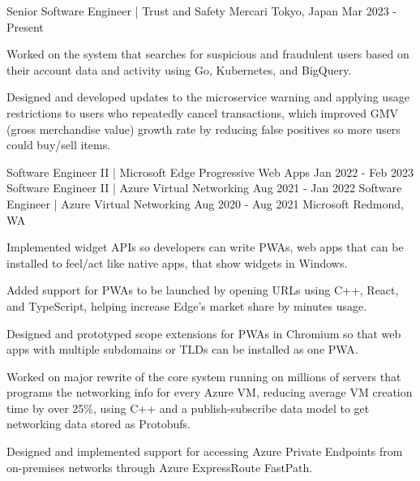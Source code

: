 

\begin{cventries}

    \cventry
    {Senior Software Engineer | Trust and Safety} %
    {Mercari} %
    {Tokyo, Japan} %
    {Mar 2023 - Present} %
    {
        \begin{cvitems} %
            \item {Worked on the system that searches for suspicious and fraudulent users based on their account data and activity using Go, Kubernetes, and BigQuery.}
            \item {Designed and developed updates to the microservice warning and applying usage restrictions to users who repeatedly cancel transactions, which improved GMV (gross merchandise value) growth rate by reducing false positives so more users could buy/sell items.}
        \end{cvitems}
    }

    \cventrythreepositions
    {Software Engineer II | Microsoft Edge Progressive Web Apps}
    {Jan 2022 - Feb 2023}
    {Software Engineer II | Azure Virtual Networking}
    {Aug 2021 - Jan 2022}
    {Software Engineer | Azure Virtual Networking}
    {Aug 2020 - Aug 2021}
    {Microsoft}
    {Redmond, WA}
    {
        \begin{cvitems} %
            \item {Implemented widget APIs so developers can write PWAs, web apps that can be installed to feel/act like native apps, that show widgets in Windows.}
            \item {Added support for PWAs to be launched by opening URLs using C++, React, and TypeScript, helping increase Edge's market share by minutes usage.}
            \item {Designed and prototyped scope extensions for PWAs in Chromium so that web apps with multiple subdomains or TLDs can be installed as one PWA.}
        \end{cvitems}
    }
    {
        \begin{cvitems} %
            \item {Worked on major rewrite of the core system running on millions of servers that programs the networking info for every Azure VM, reducing average VM creation time by over 25\%, using C++ and a publish-subscribe data model to get networking data stored as Protobufs.}
            \item {Designed and implemented support for accessing Azure Private Endpoints from on-premises networks through Azure ExpressRoute FastPath.}
        \end{cvitems}
    }


\end{cventries}
